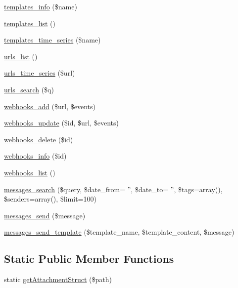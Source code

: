 \begin{DoxyCompactItemize}
\hyperlink{classMandrill_afe7c0153786a77945db3331cdaee3db2}{templates\_\-info} (\$name)
\item 
\hyperlink{classMandrill_a595fb6cd72a0d7140a31067817edfbc9}{templates\_\-list} ()
\item 
\hyperlink{classMandrill_a50e66f854b7a2288c47bcdeb5a53838d}{templates\_\-time\_\-series} (\$name)
\item 
\hyperlink{classMandrill_a8a4335b49cb084ce69edee394e35e8fd}{urls\_\-list} ()
\item 
\hyperlink{classMandrill_ab6bd81f596083cdece40fb197331903c}{urls\_\-time\_\-series} (\$url)
\item 
\hyperlink{classMandrill_a2bb0ebc1c833d77b772cbb125b7c373b}{urls\_\-search} (\$q)
\item 
\hyperlink{classMandrill_adaaf77ceabe8df995f9d70292bf9f0d5}{webhooks\_\-add} (\$url, \$events)
\item 
\hyperlink{classMandrill_a90e6aec9588217c12f054e50ecee95ca}{webhooks\_\-update} (\$id, \$url, \$events)
\item 
\hyperlink{classMandrill_a6cd5f72008311d3f969963e4daa72666}{webhooks\_\-delete} (\$id)
\item 
\hyperlink{classMandrill_a2ee739c6d858cc0cbb9a4e9656c07ad2}{webhooks\_\-info} (\$id)
\item 
\hyperlink{classMandrill_a021fbb76c0635e5e97ecac14d65e72a6}{webhooks\_\-list} ()
\item 
\hyperlink{classMandrill_a95e3c655d8a59f87e1df15447baa1130}{messages\_\-search} (\$query, \$date\_\-from= '', \$date\_\-to= '', \$tags=array(), \$senders=array(), \$limit=100)
\item 
\hyperlink{classMandrill_a3254fb19f69dfec82493ee05bbab017d}{messages\_\-send} (\$message)
\item 
\hyperlink{classMandrill_ab694c84b3e13dacaf6357b09f124d72f}{messages\_\-send\_\-template} (\$template\_\-name, \$template\_\-content, \$message)
\end{DoxyCompactItemize}
\subsection*{Static Public Member Functions}
\begin{DoxyCompactItemize}
\item 
static \hyperlink{classMandrill_ae1d24c1776d5edb985752c5da0cc8e3a}{getAttachmentStruct} (\$path)
\end{DoxyCompactItemize}
